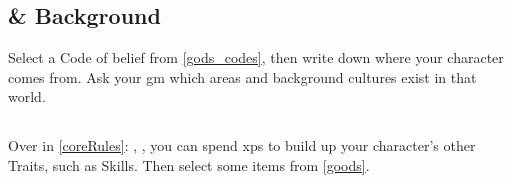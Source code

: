 \subsection{ \& Background}

Select a Code of belief from \autoref{gods_codes}, then write down where your character comes from.
  Ask your \gls{gm} which areas and background cultures exist in that world.

\subsection{}

Over in \autoref{coreRules}: , , you can spend \glspl{xp} to build up your character's other Traits, such as Skills.
Then select some items from \autoref{goods}.

